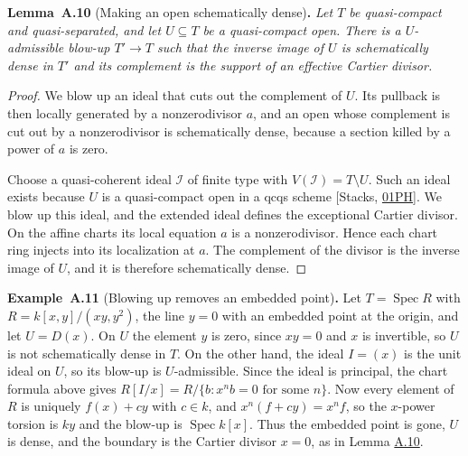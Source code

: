 \documentclass[11pt]{article}
\newenvironment{bpstatement}[2]{\par\addvspace{0.6\baselineskip}\noindent\textbf{#1}#2\textbf{.}\enspace\ignorespaces}
  {\par\addvspace{0.4\baselineskip}}
\newenvironment{bpstatementit}[2]{\begin{bpstatement}{#1}{#2}\itshape\ignorespaces}{\end{bpstatement}}
\begin{document}
\label{bp27}%
\begin{bpstatementit}{Lemma~A.10}{ (Making an open schematically dense)}
Let \(T\) be quasi-compact and quasi-separated, and let \(U\subseteq T\) be a quasi-compact open. There is a \(U\)-admissible blow-up \(T'\to T\) such that the inverse image of \(U\) is schematically dense in \(T'\) and its complement is the support of an effective Cartier divisor.
\end{bpstatementit}

\begin{proof}[{Proof}]\label{bp28}%
We blow up an ideal that cuts out the complement of \(U\). Its pullback is then locally generated by a nonzerodivisor \(a\), and an open whose complement is cut out by a nonzerodivisor is schematically dense, because a section killed by a power of \(a\) is zero.

Choose a quasi-coherent ideal \(\mathcal I\) of finite type with \(V(\mathcal I)=T\setminus U\). Such an ideal exists because \(U\) is a quasi-compact open in a qcqs scheme [Stacks, \href{https://stacks.math.columbia.edu/tag/01PH}{01PH}]. We blow up this ideal, and the extended ideal defines the exceptional Cartier divisor. On the affine charts its local equation \(a\) is a nonzerodivisor. Hence each chart ring injects into its localization at \(a\). The complement of the divisor is the inverse image of \(U\), and it is therefore schematically dense.
\end{proof}

\label{bp29}%
\begin{bpstatement}{Example~A.11}{ (Blowing up removes an embedded point)}
Let \(T=\operatorname{Spec}R\) with \(R=k[x,y]/(xy,y^2)\), the line \(y=0\) with an embedded point at the origin, and let \(U=D(x)\). On \(U\) the element \(y\) is zero, since \(xy=0\) and \(x\) is invertible, so \(U\) is not schematically dense in \(T\). On the other hand, the ideal \(I=(x)\) is the unit ideal on \(U\), so its blow-up is \(U\)-admissible. Since the ideal is principal, the chart formula above gives \(R[I/x]=R/\{b:x^nb=0\text{ for some }n\}\). Now every element of \(R\) is uniquely \(f(x)+cy\) with \(c\in k\), and \(x^n(f+cy)=x^nf\), so the \(x\)-power torsion is \(ky\) and the blow-up is \(\operatorname{Spec}k[x]\). Thus the embedded point is gone, \(U\) is dense, and the boundary is the Cartier divisor \(x=0\), as in Lemma \hyperref[bp27]{A.10}.
\end{bpstatement}
\end{document}
